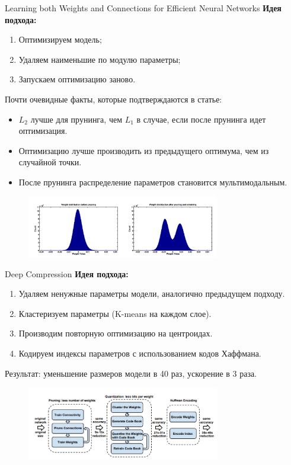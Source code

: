 \documentclass[10pt,pdf,utf8,russian,aspectratio=169]{beamer}
\begin{document}
\begin{frame}{Learning both Weights and Connections for Efficient Neural Networks}
\textbf{Идея подхода:}
\begin{enumerate}
\item Оптимизируем модель;
\item Удаляем наименьшие по модулю параметры;
\item Запускаем оптимизацию заново.
\end{enumerate}

Почти очевидные факты, которые подтверждаются в статье:
\begin{itemize}
\item $L_2$ лучше для прунинга, чем $L_1$ в случае, если после прунинга идет оптимизация.
\item Оптимизацию лучше производить из предыдущего оптимума, чем из случайной точки.
\item После прунинга распределение параметров становится мультимодальным.
\end{itemize}
\begin{figure}
\includegraphics[width=0.75\textwidth]{bimodal.png}
\end{figure}


\end{frame}


\begin{frame}{Deep Compression}
\textbf{Идея подхода:}
\begin{enumerate}
\item Удаляем ненужные параметры модели, аналогично предыдущем подходу.
\item Кластеризуем параметры (K-means на каждом слое).
\item Производим повторную оптимизацию на центроидах.
\item Кодируем индексы параметров с использованием кодов Хаффмана.
\end{enumerate}

Результат: уменьшение размеров модели в 40 раз, ускорение в 3 раза.
\begin{figure}
\includegraphics[width=0.75\textwidth]{huffman.png}
\end{figure}

\end{frame}
\end{document}
